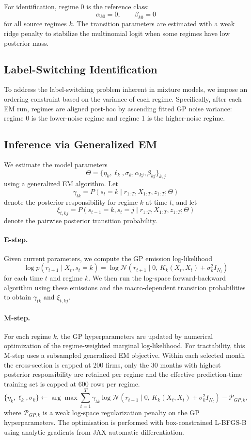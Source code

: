 \documentclass[11pt]{article}
\begin{document}
For identification, regime \(0\) is the reference class:
\[
\alpha_{k0}=0,\qquad \beta_{k0}=0
\]
for all source regimes \(k\). The transition parameters are estimated with a weak ridge penalty to stabilize the multinomial logit when some regimes have low posterior mass.

\subsection{Label-Switching Identification}
To address the label-switching problem inherent in mixture models, we impose an ordering constraint based on the variance of each regime. Specifically, after each EM run, regimes are aligned post-hoc by ascending fitted GP noise variance: regime 0 is the lower-noise regime and regime 1 is the higher-noise regime.

\subsection{Inference via Generalized EM}
We estimate the model parameters
\[
\Theta=\{\eta_k,\ell_k,\sigma_k,\alpha_{kj},\beta_{kj}\}_{k,j}
\]
using a generalized EM algorithm. Let
\[
\gamma_{tk}
=
P(s_t=k \mid r_{1:T},X_{1:T},z_{1:T};\Theta)
\]
denote the posterior responsibility for regime \(k\) at time \(t\), and let
\[
\xi_{t,kj}
=
P(s_{t-1}=k,s_t=j \mid r_{1:T},X_{1:T},z_{1:T};\Theta)
\]
denote the pairwise posterior transition probability.

\paragraph{E-step.}
Given current parameters, we compute the GP emission log-likelihood
\[
\log p(r_{t+1}\mid X_t,s_t=k)
=
\log \mathcal{N}
\!\left(
r_{t+1}\mid 0,\,
K_k(X_t,X_t)+\sigma_k^2 I_{N_t}
\right)
\]
for each time \(t\) and regime \(k\). We then run the log-space forward-backward algorithm using these emissions and the macro-dependent transition probabilities to obtain \(\gamma_{tk}\) and \(\xi_{t,kj}\).

\paragraph{M-step.}
For each regime \(k\), the GP hyperparameters are updated by numerical optimization of the regime-weighted marginal log-likelihood. For tractability, this M-step uses a subsampled generalized EM objective. Within each selected month the cross-section is capped at $200$ firms, only the 30 months with highest posterior responsibility are retained per regime and the effective prediction-time training set is capped at 600 rows per regime.
\[
\{\eta_k,\ell_k,\sigma_k\}
\leftarrow
\arg\max
\sum_{t=1}^{T}
\gamma_{tk}
\log
\mathcal{N}
\!\left(
r_{t+1}
\mid
0,\,
K_k(X_t,X_t)+\sigma_k^2 I_{N_t}
\right)
-
\mathcal{P}_{GP,k},
\]
where \(\mathcal{P}_{GP,k}\) is a weak log-space regularization penalty on the GP hyperparameters. The optimisation is performed with box-constrained L-BFGS-B using analytic gradients from JAX automatic differentiation. 
\end{document}

